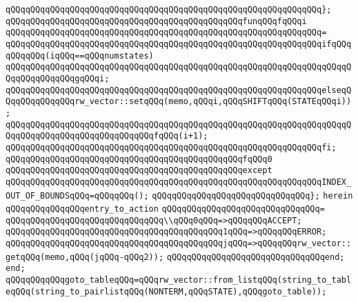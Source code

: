 \verb|qQQqqQQqqQQqqQQqqQQqqQQqqQQqqQQqqQQqqQQqqQQqqQQqqQQqqQQqqQQqqQQq};|\newline
\newline
\verb|qQQqqQQqqQQqqQQqqQQqqQQqqQQqqQQqqQQqqQQqqQQqqQQqfunqQQqfqQQqi|\newline
\verb|qQQqqQQqqQQqqQQqqQQqqQQqqQQqqQQqqQQqqQQqqQQqqQQqqQQqqQQqqQQqqQQq=|\newline
\verb|qQQqqQQqqQQqqQQqqQQqqQQqqQQqqQQqqQQqqQQqqQQqqQQqqQQqqQQqqQQqqQQqifqQQqqQQqqQQq(iqQQq==qQQqnumstates)|\newline
\verb|qQQqqQQqqQQqqQQqqQQqqQQqqQQqqQQqqQQqqQQqqQQqqQQqqQQqqQQqqQQqqQQqqQQqqQQqqQQqqQQqqQQqgqQQqi;|\newline
\verb|qQQqqQQqqQQqqQQqqQQqqQQqqQQqqQQqqQQqqQQqqQQqqQQqqQQqqQQqqQQqqQQqelseqQQqqQQqqQQqqQQqrw_vector::setqQQq(memo,qQQqi,qQQqSHIFTqQQq(STATEqQQqi));|\newline
\verb|qQQqqQQqqQQqqQQqqQQqqQQqqQQqqQQqqQQqqQQqqQQqqQQqqQQqqQQqqQQqqQQqqQQqqQQqqQQqqQQqqQQqqQQqqQQqqQQqqQQqfqQQq(i+1);|\newline
\verb|qQQqqQQqqQQqqQQqqQQqqQQqqQQqqQQqqQQqqQQqqQQqqQQqqQQqqQQqqQQqqQQqfi;|\newline
\newline
\verb|qQQqqQQqqQQqqQQqqQQqqQQqqQQqqQQqqQQqqQQqqQQqqQQqfqQQq0|\newline
\verb|qQQqqQQqqQQqqQQqqQQqqQQqqQQqqQQqqQQqqQQqqQQqqQQqexcept|\newline
\verb|qQQqqQQqqQQqqQQqqQQqqQQqqQQqqQQqqQQqqQQqqQQqqQQqqQQqqQQqqQQqqQQqINDEX_OUT_OF_BOUNDSqQQq=qQQqqQQq();|\newline
\verb|qQQqqQQqqQQqqQQqqQQqqQQqqQQqqQQq};|\newline
\verb|herein|\newline
\verb|qQQqqQQqqQQqqQQqentry_to_action|\newline
\verb|qQQqqQQqqQQqqQQqqQQqqQQqqQQqqQQq=|\newline
\verb|qQQqqQQqqQQqqQQqqQQqqQQqqQQqqQQq\\qQQq0qQQq=>qQQqqQQqACCEPT;|\newline
\verb|qQQqqQQqqQQqqQQqqQQqqQQqqQQqqQQqqQQqqQQqqQQq1qQQq=>qQQqqQQqERROR;|\newline
\verb|qQQqqQQqqQQqqQQqqQQqqQQqqQQqqQQqqQQqqQQqqQQqjqQQq=>qQQqqQQqrw_vector::getqQQq(memo,qQQq(jqQQq-qQQq2));|\newline
\verb|qQQqqQQqqQQqqQQqqQQqqQQqqQQqqQQqend;|\newline
\verb|end;|\newline
\newline
\verb|qQQqqQQqqQQqgoto_tableqQQq=qQQqrw_vector::from_listqQQq(string_to_tableqQQq(string_to_pairlistqQQq(NONTERM,qQQqSTATE),qQQqgoto_table));|\newline
